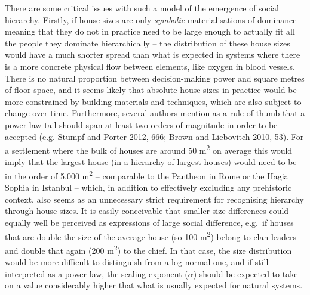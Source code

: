 \documentclass[
  12pt,
  a4paper, twoside]{book}
\begin{document}
There are some critical issues with such a model of the emergence of social hierarchy. Firstly, if house sizes are only \emph{symbolic} materialisations of dominance -- meaning that they do not in practice need to be large enough to actually fit all the people they dominate hierarchically -- the distribution of these house sizes would have a much shorter spread than what is expected in systems where there is a more concrete physical flow between elements, like oxygen in blood vessels. There is no natural proportion between decision-making power and square metres of floor space, and it seems likely that absolute house sizes in practice would be more constrained by building materials and techniques, which are also subject to change over time. Furthermore, several authors mention as a rule of thumb that a power-law tail should span at least two orders of magnitude in order to be accepted (e.g. Stumpf and Porter 2012, 666; Brown and Liebovitch 2010, 53). For a settlement where the bulk of houses are around 50 m\textsuperscript{2} on average this would imply that the largest house (in a hierarchy of largest houses) would need to be in the order of 5.000 m\textsuperscript{2} -- comparable to the Pantheon in Rome or the Hagia Sophia in Istanbul -- which, in addition to effectively excluding any prehistoric context, also seems as an unnecessary strict requirement for recognising hierarchy through house sizes. It is easily conceivable that smaller size differences could equally well be perceived as expressions of large social difference, e.g.~if houses that are double the size of the average house (so 100 m\textsuperscript{2}) belong to clan leaders and double that again (200 m\textsuperscript{2}) to the chief. In that case, the size distribution would be more difficult to distinguish from a log-normal one, and if still interpreted as a power law, the scaling exponent (\(\alpha\)) should be expected to take on a value considerably higher that what is usually expected for natural systems.
\end{document}
